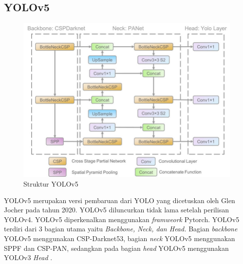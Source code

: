 \subsection{YOLOv5}
\label{subsec:yolov5}

\begin{figure}[H]
    \centering
    \includegraphics[scale=0.55]{gambar/yolov5.png}
    \caption{Struktur YOLOv5 \citep*{article}}
    \label{fig:strukturyolov5}
\end{figure}

YOLOv5 merupakan versi pembaruan dari YOLO yang dicetuskan oleh Glen Jocher pada tahun 2020. YOLOv5 diluncurkan tidak lama setelah perilisan YOLOv4. YOLOv5 diperkenalkan menggunakan \textit{framweork} Pytorch. YOLOv5 terdiri dari 3 bagian utama yaitu \textit{Backbone, Neck, \textnormal{dan} Head.} Bagian \textit{backbone} YOLOv5 menggunakan CSP-Darknet53, bagian \textit{neck} YOLOv5 menggunakan SPPF dan CSP-PAN, sedangkan pada bagian \textit{head} YOLOv5 menggunakan YOLOv3 \textit{Head} \citep*{ultralyticsyolo}.
